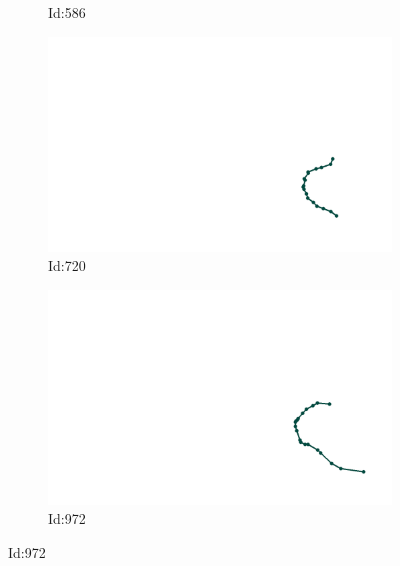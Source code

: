 \documentclass[12pt,twoside]{report}
\begin{document}
\begin{figure}
\begin{subfigure}[b]{0.20\textwidth}
\caption{Id:586}
\end{subfigure}
\begin{subfigure}[b]{0.20\textwidth}
\centering
\includegraphics[width=\textwidth]{../../trajectories/720.png}
\caption{Id:720}
\end{subfigure}
\begin{subfigure}[b]{0.20\textwidth}
\centering
\includegraphics[width=\textwidth]{../../trajectories/972.png}
\caption{Id:972}
\end{subfigure}
\end{figure}
\end{document}
